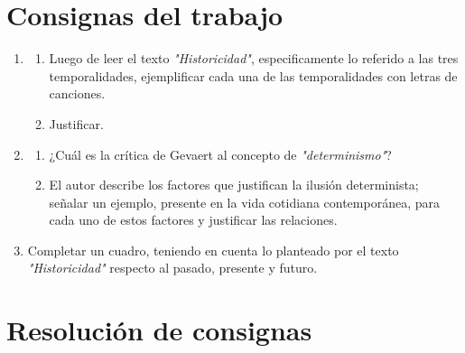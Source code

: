 \documentclass[10pt, a4paper]{article}
\begin{document}
  

  \section*{Consignas del trabajo}

    \begin{enumerate}

      \item \begin{enumerate}

        \item Luego de leer el texto \textit{"Historicidad"}, especificamente lo
          referido a las tres temporalidades, ejemplificar cada una de las temporalidades
          con letras de canciones.

        \item Justificar.

      \end{enumerate}

      \item \begin{enumerate}

        \item ¿Cuál es la crítica de Gevaert al concepto de \textit{"determinismo"}?

        \item El autor describe los factores que justifican la ilusión determinista; 
          señalar un ejemplo, presente en la vida cotidiana contemporánea, para cada 
          uno de estos factores y justificar las relaciones.

      \end{enumerate}

      \item Completar un cuadro, teniendo en cuenta lo planteado por 
        el texto \textit{"Historicidad"} respecto al pasado, presente y futuro.

  \end{enumerate}

  \vspace{1.5cm}

  \section*{Resolución de consignas}
    
\end{document}
